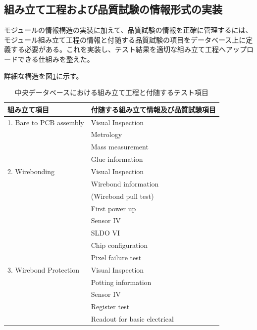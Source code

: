 \subsection{組み立て工程および品質試験の情報形式の実装}
モジュールの情報構造の実装に加えて、品質試験の情報を正確に管理するには、モジュール組み立て工程の情報と付随する品質試験の項目をデータベース上に定義する必要がある。これを実装し、テスト結果を適切な組み立て工程へアップロードできる仕組みを整えた。

詳細な構造を図\ref{pd_stage_structure}に示す。

\begin{table}[tbp]
\begin{center}
\caption[中央データベースにおける組み立て工程と付随するテスト項目]{中央データベースにおける組み立て工程と付随するテスト項目}
\label{pd_stage_structure}
  \begin{tabular}{|ll|} \hline
    組み立て項目 & 付随する組み立て情報及び品質試験項目 \\ \hline
    1. Bare to PCB assembly & Visual Inspection \\ 
                            & Metrology \\
                            & Mass measurement \\
                            & Glue information \\\hline
    2. Wirebonding          & Visual Inspection \\ 
                            & Wirebond information \\
                            & (Wirebond pull test)\\
                            & First power up\\
                            & Sensor IV\\
                            & SLDO VI\\
                            & Chip configuration\\
                            & Pixel failure test\\\hline

    3. Wirebond Protection  & Visual Inspection \\ 
                            & Potting information \\
                            & Sensor IV \\
                            & Register test\\
                            & Readout for basic electrical \\\hline


\end{tabular}
\end{center}
\end{table}
